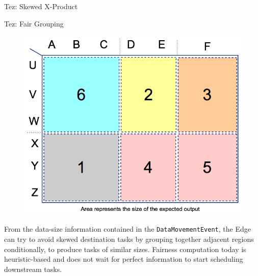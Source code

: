 \documentclass[final]{beamer}
\newlength{\onecolwid}
\begin{document}
\begin{frame}[t]
\begin{columns}[t]
\begin{column}{\onecolwid}
\begin{block}{Tez: Skewed X-Product}
\end{block}



\begin{block}{Tez: Fair Grouping}

\begin{figure}
\includegraphics{figures/Data-Grouping.png}
\end{figure}

From the data-size information contained in the \texttt{DataMovementEvent}, the Edge can try to 
avoid skewed destination tasks by grouping together adjacent regions conditionally, to produce 
tasks of similar sizes. Fairness computation today is heuristic-based and does not wait for 
perfect information to start scheduling downstream tasks.
\end{block}


\end{column} %

\end{columns} %

\end{frame} %
\end{document}
